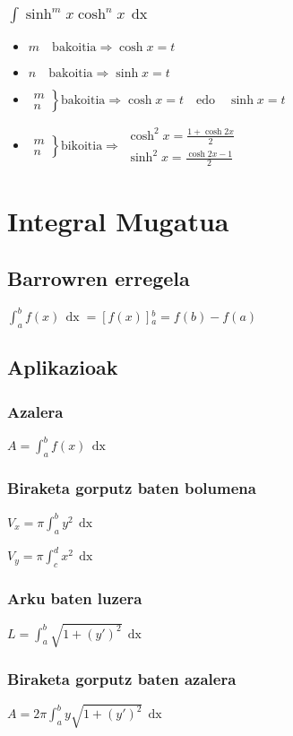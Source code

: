 \documentclass[8pt]{article}
\DeclareMathOperator{\xder}{\, \mathrm{d}x}
\begin{document}
		\subsubsection{$ \int \sinh^{m}x \cosh^{n} x \xder $}
			\begin{itemize}
				\item $ m \quad \text{bakoitia} \Rightarrow \cosh x = t $
				\item $ n \quad \text{bakoitia} \Rightarrow \sinh x = t $
				\item $ 
					\left.
					\begin{array}{c}
						m\\
						n
					\end{array}  \right\} \text{bakoitia} \Rightarrow
					\cosh x = t \quad \text{edo}\quad\sinh x = t $
				\item $
					\left.
					\begin{array}{c}
						m\\
						n
					\end{array} \right\} \text{bikoitia} \Rightarrow
						\begin{array}{c}
							\cosh^{2} x = \frac{1+\cosh 2x}{2}\\
							\sinh^{2} x = \frac{\cosh 2x -1}{2}
						\end{array} $
			\end{itemize}
			

\section{Integral Mugatua}
	\subsection{Barrowren erregela}
		$ \int_a^b f(x) \xder = [f(x)]{_a^b} = f(b) - f(a) $
	
	\subsection{Aplikazioak}
		\subsubsection{Azalera}
			$ A = \int_a^b f(x) \xder $

		\subsubsection{Biraketa gorputz baten bolumena}
			$ V_x = \pi \int_a^b y^2 \xder $

			$ V_y = \pi \int_c^d x^2 \xder $

		\subsubsection{Arku baten luzera}
			$ L = \int_a^b \sqrt{1 + {(y\prime)}^{2}} \xder $

		\subsubsection{Biraketa gorputz baten azalera}
			$ A = 2\pi \int_a^b y \sqrt{1 + {(y\prime)}^{2}} \xder $
\end{document}
